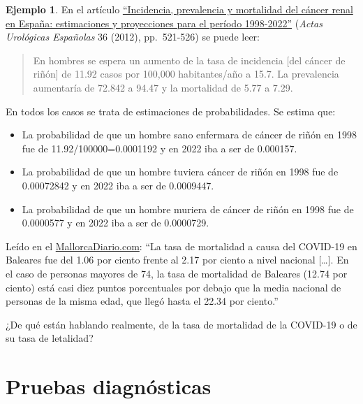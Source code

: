 \documentclass[
]{book}
\theoremstyle{definition}
\theoremstyle{definition}
\newtheorem{example}{Ejemplo}[chapter]
\theoremstyle{definition}
\theoremstyle{definition}
\theoremstyle{remark}
\begin{document}
\begin{example}
\protect\hypertarget{exm:unnamed-chunk-147}{}\label{exm:unnamed-chunk-147}En el artículo \href{https://www.sciencedirect.com/science/article/pii/S0210480611003767}{``Incidencia, prevalencia y mortalidad del cáncer renal en España: estimaciones y proyecciones para el período 1998-2022''} (\emph{Actas Urológicas Españolas} 36 (2012), pp.~521-526) se puede leer:
\end{example}

\begin{quote}
En hombres se espera un aumento de la tasa de incidencia {[}del cáncer de riñón{]} de 11.92 casos por 100,000 habitantes/año a 15.7. La prevalencia aumentaría de 72.842 a 94.47 y la mortalidad de 5.77 a 7.29.
\end{quote}

En todos los casos se trata de estimaciones de probabilidades. Se estima que:

\begin{itemize}
\item
  La probabilidad de que un hombre sano enfermara de cáncer de riñón en 1998 fue de 11.92/100000=0.0001192 y en 2022 iba a ser de 0.000157.
\item
  La probabilidad de que un hombre tuviera cáncer de riñón en 1998 fue de 0.00072842 y en 2022 iba a ser de 0.0009447.
\item
  La probabilidad de que un hombre muriera de cáncer de riñón en 1998 fue de 0.0000577 y en 2022 iba a ser de 0.0000729.
\end{itemize}

\begin{rmdexercici}
Leído en el \href{https://www.mallorcadiario.com/mortalidad-coronavirus-baleares-tasa}{MallorcaDiario.com}: ``La tasa de mortalidad a causa del COVID-19 en Baleares fue del 1.06 por ciento frente al 2.17 por ciento a nivel nacional {[}\ldots{]}. En el caso de personas mayores de 74, la tasa de mortalidad de Baleares (12.74 por ciento) está casi diez puntos porcentuales por debajo que la media nacional de personas de la misma edad, que llegó hasta el 22.34 por ciento.''

¿De qué están hablando realmente, de la tasa de mortalidad de la COVID-19 o de su tasa de letalidad?
\end{rmdexercici}

\hypertarget{pruebas-diagnuxf3sticas}{%
\section{Pruebas diagnósticas}\label{pruebas-diagnuxf3sticas}}
\end{document}
